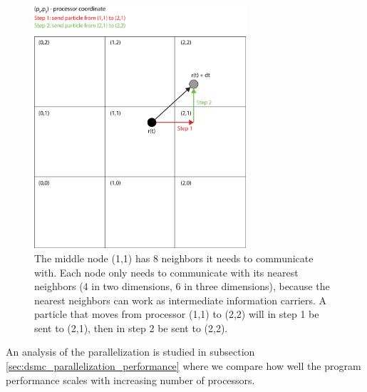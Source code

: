\begin{figure}[htpb]
\begin{center}
\includegraphics[width=0.7\textwidth, trim=0cm 0cm 0cm 0cm, clip]{DSMC/figures/parallelization_facet_technique.eps}
\end{center}
\caption{The middle node (1,1) has 8 neighbors it needs to communicate with. Each node only needs to communicate with its nearest neighbors (4 in two dimensions, 6 in three dimensions), because the nearest neighbors can work as intermediate information carriers. A particle that moves from processor (1,1) to (2,2) will in step 1 be sent to (2,1), then in step 2 be sent to (2,2).}
\label{fig:parallelization_facet_technique}
\end{figure}
An analysis of the parallelization is studied in subsection \ref{sec:dsmc_parallelization_performance} where we compare how well the program performance scales with increasing number of processors. 